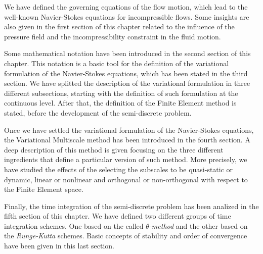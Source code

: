 We have defined the governing equations of the flow motion, which lead to the well-known Navier-Stokes equations for incompressible flows. Some insights are also given in the first section of this chapter related to the influence of the pressure field and the incompressibility constraint in the fluid motion.

Some mathematical notation have been introduced in the second section of this chapter. This notation is a basic tool for the definition of the variational formulation of the Navier-Stokes equations, which has been stated in the third section. We have splitted the description of the variational formulation in three different subsections, starting with the definition of such formulation at the continuous level. After that, the definition of the Finite Element method is stated, before the development of the semi-discrete problem.

Once we have settled the variational formulation of the Navier-Stokes equations, the Variational Multiscale method has been introduced in the fourth section. A deep description of this method is given focusing on the three different ingredients that define a particular version of such method. More precisely, we have studied the effects of the selecting the subscales to be quasi-static or dynamic, linear or nonlinear and orthogonal or non-orthogonal with respect to the Finite Element space.

Finally, the time integration of the semi-discrete problem has been analized in the fifth section of this chapter. We have defined two different groups of time integration schemes. One based on the called \textit{$\theta$-method} and the other based on the \textit{Runge-Kutta} schemes. Basic concepts of stability and order of convergence have been given in this last section.
